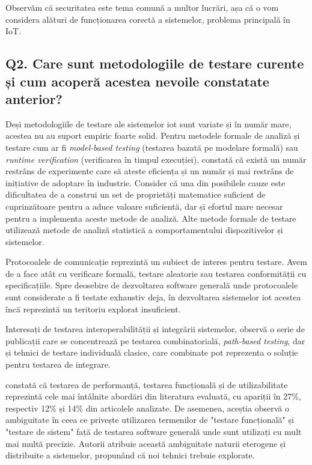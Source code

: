Observăm că securitatea este tema comună a multor lucrări, așa că o vom considera alături de funcționarea corectă a sistemelor, problema principală în IoT.


\subsection*{Q2. Care sunt metodologiile de testare curente și cum acoperă acestea nevoile constatate anterior?}

Deși metodologiile de testare ale sistemelor \acrshort{iot} sunt variate și în număr mare, acestea nu au suport empiric foarte solid. Pentru metodele formale de analiză și testare cum ar fi \textit{model-based testing} (testarea bazată pe modelare formală) sau \textit{runtime verification} (verificarea în timpul execuției), \citet{Ahmed2019} constată că există un număr restrâns de experimente care să ateste eficiența și un număr și mai restrâns de inițiative de adoptare în industrie. Consider că una din posibilele cauze este dificultatea de a construi un set de proprietăți matematice suficient de cuprinzătoare pentru a aduce valoare suficientă, dar și efortul mare necesar pentru a implementa aceste metode de analiză. Alte metode formale de testare utilizează metode de analiză statistică a comportamentului dispozitivelor și sistemelor. 

Protocoalele de comunicație reprezintă un subiect de interes pentru testare. Avem de a face atât cu verificare formală, testare aleatorie sau testarea conformității cu specificațiile. Spre deosebire de dezvoltarea software generală unde protocoalele sunt considerate a fi testate exhaustiv deja, în dezvoltarea sistemelor \acrshort{iot} acestea încă reprezintă un teritoriu explorat insuficient. 

Interesați de testarea interoperabilității și integrării sistemelor, \citet{Bures2020} observă o serie de publicații care se concentrează pe testarea combinatorială, \textit{path-based testing}, dar și tehnici de testare individuală clasice, care combinate pot reprezenta o soluție pentru testarea de integrare. 

\citet{Corts2019} constată că testarea de performanță, testarea funcțională și de utilizabilitate reprezintă cele mai întâlnite abordări din literatura evaluată, cu apariții în 27\%, respectiv 12\% și 14\% din articolele analizate. De asemenea, aceștia observă o ambiguitate în ceea ce privește utilizarea termenilor de "testare funcțională" și "testare de sistem" față de testarea software generală unde sunt utilizați cu mult mai multă precizie. Autorii atribuie această ambiguitate naturii eterogene și distribuite a sistemelor, propunând că noi tehnici trebuie explorate. 

